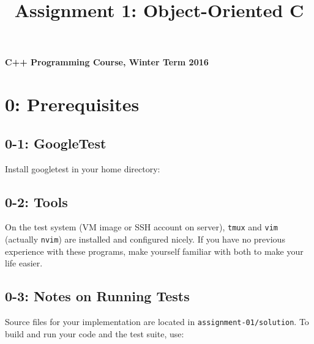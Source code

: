 \documentclass[]{article}
\title{Assignment 1: Object-Oriented C}
\date{}
\newenvironment{Shaded}{}{}
\newcommand{\KeywordTok}[1]{\textcolor[rgb]{0.00,0.44,0.13}{\textbf{{#1}}}}
\newcommand{\StringTok}[1]{\textcolor[rgb]{0.25,0.44,0.63}{{#1}}}
\newcommand{\OtherTok}[1]{\textcolor[rgb]{0.00,0.44,0.13}{{#1}}}
\newcommand{\NormalTok}[1]{{#1}}
\begin{document}
\maketitle

\textbf{C++ Programming Course, Winter Term 2016}

\section{0: Prerequisites}\label{prerequisites}

\subsection{0-1: GoogleTest}\label{googletest}

Install googletest in your home directory:

\begin{Shaded}
\end{Shaded}

\subsection{0-2: Tools}\label{tools}

On the test system (VM image or SSH account on server), \texttt{tmux}
and \texttt{vim} (actually \texttt{nvim}) are installed and configured
nicely. If you have no previous experience with these programs, make
yourself familiar with both to make your life easier.

\subsection{0-3: Notes on Running Tests}\label{notes-on-running-tests}

Source files for your implementation are located in
\texttt{assignment-01/solution}. To build and run your code and the test
suite, use:
\end{document}
